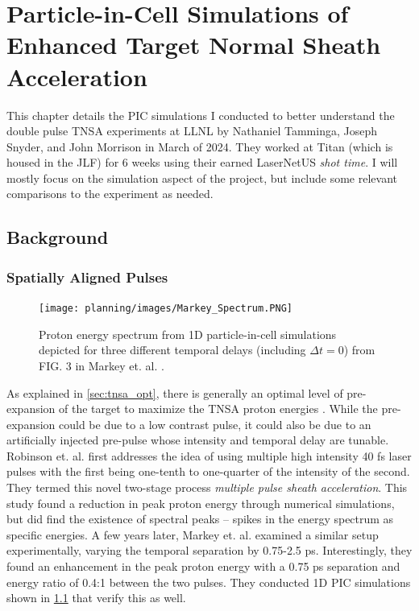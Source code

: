 \chapter{Particle-in-Cell Simulations of Enhanced Target Normal Sheath Acceleration} \label{ch:4}

This chapter details the \gls{PIC} simulations I conducted to better understand the double pulse \gls{TNSA} experiments at \gls{LLNL} by Nathaniel Tamminga, Joseph Snyder, and John Morrison in March of 2024. They worked at Titan (which is housed in the \gls{JLF}) for 6 weeks using their earned LaserNetUS \emph{shot time}. I will mostly focus on the simulation aspect of the project, but include some relevant comparisons to the experiment as needed. 

\section{Background} \label{sec:etnsa_background}

\subsection{Spatially Aligned Pulses} \label{sec:spatialalign}

\begin{figure}
	\centering 
	\texttt{[image: planning/images/Markey\_Spectrum.PNG]}
	\caption{Proton energy spectrum from 1D particle-in-cell simulations depicted for three different temporal delays (including $\Delta t = 0$) from FIG. 3 in Markey et. al. \cite{Markey_2010_PRL}.}
	\label{fig:markey_spectrum}
\end{figure}

As explained in \cref{sec:tnsa_opt}, there is generally an optimal level of pre-expansion of the target to maximize the \gls{TNSA} proton energies \cite{McKenna_2008_LaPB,Fuchs_2007_PRL}. While the pre-expansion could be due to a low contrast pulse, it could also be due to an artificially injected pre-pulse whose intensity and temporal delay are tunable. Robinson et. al. \cite{Robinson_2007_PPCF} first addresses the idea of using multiple high intensity 40 fs laser pulses with the first being one-tenth to one-quarter of the intensity of the second. They termed this novel two-stage process \emph{multiple pulse sheath acceleration}. This study found a reduction in peak proton energy through numerical simulations, but did find the existence of spectral peaks -- spikes in the energy spectrum as specific energies. A few years later, Markey et. al. \cite{Markey_2010_PRL} examined a similar setup experimentally, varying the temporal separation by 0.75-2.5 ps. Interestingly, they found an enhancement in the peak proton energy with a 0.75 ps separation and energy ratio of 0.4:1 between the two pulses. They conducted 1D PIC simulations shown in \cref{fig:markey_spectrum} that verify this as well.

